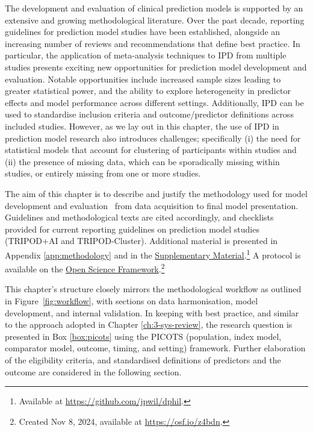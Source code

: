 The development and evaluation of clinical prediction models is supported by an extensive and growing methodological literature. Over the past decade, reporting guidelines for prediction model studies have been established\cite{collins2015, moons2015, debray2023, collins2024A}, alongside an increasing number of reviews and recommendations that define best practice\cite{efthimiou2024, collins2024B, riley2024A, riley2024B, vanSmeden2021}. In particular, the application of meta-analysis techniques to IPD from multiple studies presents exciting new opportunities for prediction model development and evaluation\cite{riley2021_book_ch17, debray2023}. Notable opportunities include increased sample sizes leading to greater statistical power, and the ability to explore heterogeneity in predictor effects and model performance across different settings. Additionally, IPD can be used to standardise inclusion criteria and outcome/predictor definitions across included studies. However, as we lay out in this chapter, the use of IPD in prediction model research also introduces challenges; specifically (i) the need for statistical models that account for clustering of participants within studies and (ii) the presence of missing data, which can be sporadically missing within studies, or entirely missing from one or more studies\cite{debray2023}.

The aim of this chapter is to describe and justify the methodology used for model development and evaluation \textemdash\ from data acquisition to final model presentation. Guidelines and methodological texts are cited accordingly, and checklists provided for current reporting guidelines on prediction model studies (TRIPOD+AI and TRIPOD-Cluster)\cite{collins2024A,debray2023}. Additional material is presented in Appendix \ref{app:methodology} and in the \href{https://github.com/jpwil/dphil}{Supplementary Material}.\footnote{Available at \url{https://github.com/jpwil/dphil}.} A protocol is available on the \href{https://osf.io/z4bdn}{Open Science Framework}.\footnote{Created Nov 8, 2024, available at \url{https://osf.io/z4bdn}.}

This chapter's structure closely mirrors the methodological workflow as outlined in Figure~\ref{fig:workflow}, with sections on data harmonisation, model development, and internal validation. In keeping with best practice, and similar to the approach adopted in Chapter \ref{ch:3-sys-review}, the research question is presented in Box \ref{box:picots} using the PICOTS (population, index model, comparator model, outcome, timing, and setting) framework\cite{riley2021_book_ch17, debray2017}. Further elaboration of the eligibility criteria, and standardised definitions of predictors and the outcome are considered in the following section.

